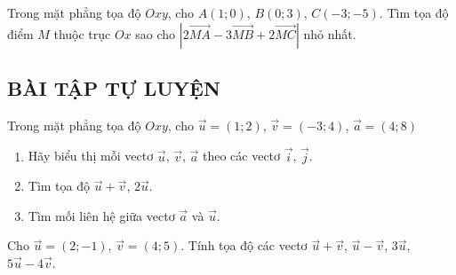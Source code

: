 \begin{vd}%
	Trong mặt phẳng tọa độ $ Oxy$, cho $ A(1;0)$, $ B(0;3)$, $ C(-3;-5)$. Tìm tọa độ điểm $ M$ thuộc trục $ Ox$ sao cho $\left|2\vec{MA}-3\vec{MB}+2\vec{MC}\right|$ nhỏ nhất.
\end{vd}

\subsection{BÀI TẬP TỰ LUYỆN}
\baitaptl
\begin{bt}%
	Trong mặt phẳng tọa độ $Oxy$, cho $\vec{u}=(1;2)$, $\vec{v}=(-3;4)$, $\vec{a}=(4;8)$
	\begin{enumerate}
		\item Hãy biểu  thị mỗi vectơ $\vec{u}$, $\vec{v}$, $\vec{a}$ theo các vectơ $\vec{i}$, $\vec{j}$.
		\item Tìm tọa độ $\vec{u}+\vec{v}$, $2\vec{u}$.
		\item Tìm mối liên hệ giữa vectơ $\vec{a}$ và $\vec{u}$.
	\end{enumerate}
\end{bt}
\begin{bt}%
	Cho $\vec{u}=(2;-1)$, $\vec{v}=(4;5)$. Tính tọa độ các vectơ $\vec{u}+\vec{v}$, $\vec{u}-\vec{v}$, $3\vec{u}$, $5\vec{u}-4\vec{v}$.
\end{bt}

